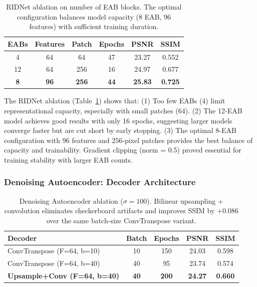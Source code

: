 \begin{table}[t]
\centering
\small
\setlength{\tabcolsep}{3pt}
\begin{tabular}{cccccc}
\toprule
\textbf{EABs} & \textbf{Features} & \textbf{Patch} & \textbf{Epochs} & \textbf{PSNR} & \textbf{SSIM} \\
\midrule
4 & 64 & 64 & 47 & 23.27 & 0.552 \\
12 & 64 & 256 & 16 & 24.97 & 0.677 \\
\textbf{8} & \textbf{96} & \textbf{256} & \textbf{44} & \textbf{25.83} & \textbf{0.725} \\
\bottomrule
\end{tabular}
\caption{RIDNet ablation on number of EAB blocks. The optimal configuration balances model capacity (8 EAB, 96 features) with sufficient training duration.}
\label{tab:ridnet_ablation}
\end{table}

The RIDNet ablation (Table~\ref{tab:ridnet_ablation}) shows that: (1) Too few EABs (4) limit representational capacity, especially with small patches (64). (2) The 12-EAB model achieves good results with only 16 epochs, suggesting larger models converge faster but are cut short by early stopping. (3) The optimal 8-EAB configuration with 96 features and 256-pixel patches provides the best balance of capacity and trainability. Gradient clipping (norm = 0.5) proved essential for training stability with larger EAB counts.

\subsubsection{Denoising Autoencoder: Decoder Architecture}

\begin{table}[t]
\centering
\small
\setlength{\tabcolsep}{3pt}
\begin{tabular}{lcccc}
\toprule
\textbf{Decoder} & \textbf{Batch} & \textbf{Epochs} & \textbf{PSNR} & \textbf{SSIM} \\
\midrule
ConvTranspose (F=64, b=10) & 10 & 150 & 24.03 & 0.598 \\
ConvTranspose (F=64, b=40) & 40 & 95 & 23.74 & 0.574 \\
\textbf{Upsample+Conv (F=64, b=40)} & \textbf{40} & \textbf{200} & \textbf{24.27} & \textbf{0.660} \\
\bottomrule
\end{tabular}
\caption{Denoising Autoencoder ablation ($\sigma = 100$). Bilinear upsampling + convolution eliminates checkerboard artifacts and improves SSIM by +0.086 over the same batch-size ConvTranspose variant.}
\label{tab:dae_ablation}
\end{table}

